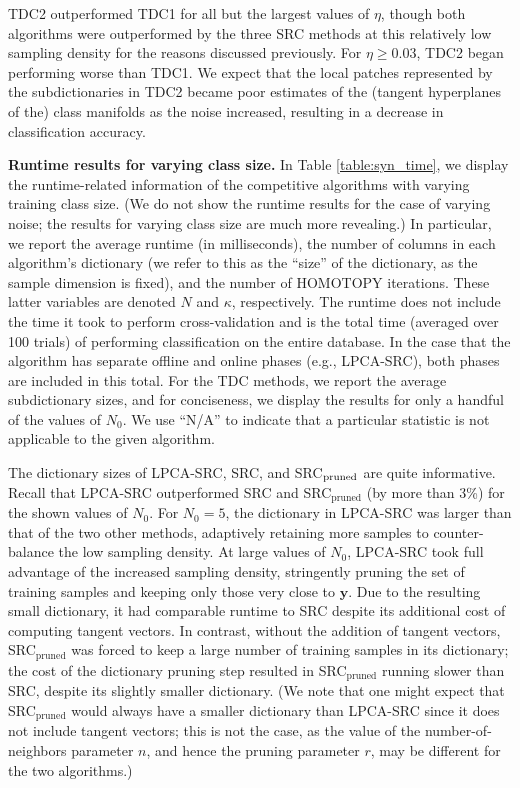 \documentclass[review]{elsarticle}
\begin{document}
TDC2 outperformed TDC1 for all but the largest values of $\eta$, though both algorithms were outperformed by the three SRC methods at this relatively low sampling density for the reasons discussed previously. For $\eta \geq 0.03$, TDC2 began performing worse than TDC1. We expect that the local patches represented by the subdictionaries in TDC2 became poor estimates of the (tangent hyperplanes of the) class manifolds as the noise increased, resulting in a decrease in classification accuracy.


\textbf{Runtime results for varying class size.} In Table \ref{table:syn_time}, we display the runtime-related information of the competitive algorithms with varying training class size. (We do not show the runtime results for the case of varying noise; the results for varying class size are much more revealing.) In particular, we report the average runtime (in milliseconds), the number of columns in each algorithm's dictionary (we refer to this as the ``size'' of the dictionary, as the sample dimension is fixed), and the number of HOMOTOPY iterations. These latter variables are denoted $N$ and $\kappa$, respectively. The runtime does not include the time it took to perform cross-validation and is the total time (averaged over 100 trials) of performing classification on the entire database. In the case that the algorithm has separate offline and online phases (e.g., LPCA-SRC), both phases are included in this total. For the TDC methods, we report the average subdictionary sizes, and for conciseness, we display the results for only a handful of the values of $N_0$. We use ``N/A'' to indicate that a particular statistic is not applicable to the given algorithm. 



The dictionary sizes of LPCA-SRC, SRC, and SRC$_\mathrm{\textnormal{pruned}}$ are quite informative. Recall that LPCA-SRC outperformed SRC and SRC$_\mathrm{pruned}$ (by more than 3\%) for the shown values of $N_0$. For $N_0 = 5$, the dictionary in LPCA-SRC was larger than that of the two other methods, adaptively retaining more samples to counter-balance the low sampling density. At large values of $N_0$, LPCA-SRC took full advantage of the increased sampling density, stringently pruning the set of training samples and keeping only those very close to $\bm{y}$. Due to the resulting small dictionary, it had comparable runtime to SRC despite its additional cost of computing tangent vectors. In contrast, without the addition of tangent vectors, SRC$_\mathrm{pruned}$ was forced to keep a large number of training samples in its dictionary; the cost of the dictionary pruning step resulted in SRC$_\mathrm{pruned}$ running slower than SRC, despite its slightly smaller dictionary. (We note that one might expect that SRC$_\mathrm{pruned}$ would always have a smaller dictionary than LPCA-SRC since it does not include tangent vectors; this is not the case, as the value of the number-of-neighbors parameter $n$, and hence the pruning parameter $r$, may be different for the two algorithms.)
\end{document}
